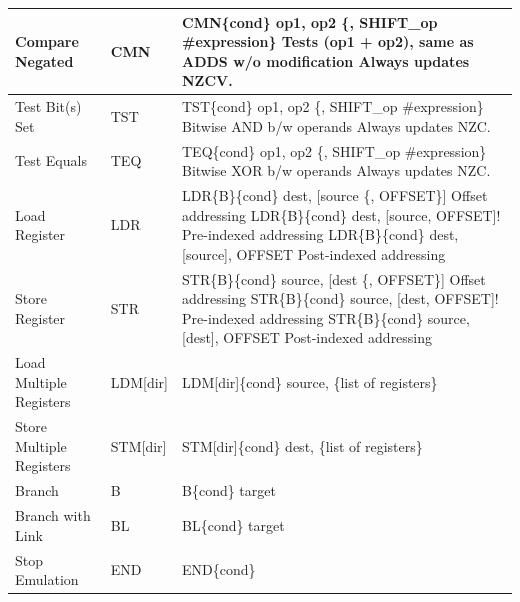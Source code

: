 \documentclass[../comorg-part1.tex]{subfiles}
\begin{document}
\begin{landscape}
\begin{longtable}{|p{4cm}|l|p{16cm}|}
Compare Negated & CMN & \ttfamily CMN\{cond\} op1, op2 \{, SHIFT\_op \#expression\} \newline Tests (op1 + op2), same as ADDS w/o modification \newline Always updates NZCV. \\ \hline
Test Bit(s) Set & TST & \ttfamily TST\{cond\} op1, op2 \{, SHIFT\_op \#expression\} \newline Bitwise AND b/w operands \newline Always updates NZC. \\ \hline
Test Equals & TEQ & \ttfamily TEQ\{cond\} op1, op2 \{, SHIFT\_op \#expression\} \newline Bitwise XOR b/w operands \newline Always updates NZC. \\ \hline
Load Register & LDR & \ttfamily LDR\{B\}\{cond\} dest, [source \{, OFFSET\}] Offset addressing \newline \ttfamily LDR\{B\}\{cond\} dest, [source, OFFSET]! Pre-indexed addressing \newline \ttfamily LDR\{B\}\{cond\} dest, [source], OFFSET Post-indexed addressing \\ \hline
Store Register & STR & \ttfamily STR\{B\}\{cond\} source, [dest \{, OFFSET\}] Offset addressing \newline \ttfamily STR\{B\}\{cond\} source, [dest, OFFSET]! Pre-indexed addressing \newline \ttfamily STR\{B\}\{cond\} source, [dest], OFFSET Post-indexed addressing \\ \hline
Load Multiple Registers & LDM[dir] & \ttfamily LDM[dir]\{cond\} source, \{list of registers\} \\ \hline
Store Multiple Registers & STM[dir] & \ttfamily STM[dir]\{cond\} dest, \{list of registers\} \\ \hline
Branch & B & \ttfamily B\{cond\} target \\ \hline
Branch with Link & BL & \ttfamily BL\{cond\} target \\ \hline
Stop Emulation & END & \ttfamily END\{cond\} \\ \hline
\end{longtable}
\vspace*{\fill}



\end{landscape}
\end{document}
